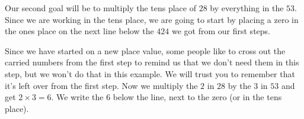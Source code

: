 \documentclass{ximera}
\begin{document}
Our second goal will be to multiply the tens place of $28$ by everything in the $53$. Since we are working in the tens place, we are going to start by placing a zero in the ones place on the next line below the $424$ we got from our first steps. 
\begin{image}
\end{image}

Since we have started on a new place value, some people like to cross out the carried numbers from the first step to remind us that we don't need them in this step, but we won't do that in this example. We will trust you to remember that it's left over from the first step. Now we multiply the $2$ in $28$ by the $3$ in $53$ and get $2 \times 3 = 6$. We write the $6$ below the line, next to the zero (or in the tens place).

\begin{image}
\end{image}
\end{document}
